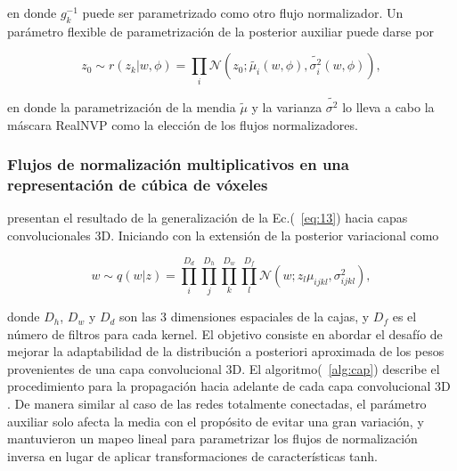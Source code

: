 \documentclass[10pt, oneside, a4paper]{article}
\begin{document}
	en donde $g_{k}^{-1}$ puede ser parametrizado como otro flujo normalizador. Un parámetro flexible de parametrización de la posterior auxiliar puede darse por
	
	\begin{equation} \label{eq:19}
	z_{0} \sim r(z_{k}|w, \phi) = \prod_{i} \mathcal{N} (z_{0}; \tilde{\mu_{i}}(w, \phi), \tilde{\sigma_{i}^{2}}(w, \phi)),
	\end{equation}	
	
	en donde la parametrización de la mendia $\tilde{\mu}$ y la varianza $\tilde{\sigma^{2}}$ lo lleva a cabo la máscara RealNVP como la elección de los flujos normalizadores.

	\subsubsection{Flujos de normalización multiplicativos en una representación de cúbica de vóxeles}
	
	\cite{mnf} presentan el resultado de la generalización de la Ec.(~\ref{eq:13}) hacia capas convolucionales 3D. Iniciando con la extensión de la posterior variacional como
	
	\begin{equation} \label{eq:20}
		w \sim q(w|z) = \prod_{i}^{D_{d}} \prod_{j}^{D_{h}} \prod_{k}^{D_{w}} \prod_{l}^{D_{f}} \mathcal{N}(w; z_{l} \mu_{ijkl}, \sigma_{ijkl}^{2}),
	\end{equation}

	donde $D_{h}$, $D_{w}$ y $D_{d}$ son las 3 dimensiones espaciales de la cajas, y $D_{f}$ es el número de filtros para cada kernel. El objetivo consiste en abordar el desafío de mejorar la adaptabilidad de la distribución a posteriori aproximada de los pesos provenientes de una capa convolucional 3D. El algoritmo(~\ref{alg:cap}) describe el procedimiento para la propagación hacia adelante de cada capa convolucional 3D \cite{mnf}.
	De manera similar al caso de las redes totalmente conectadas, el parámetro auxiliar solo afecta la media con el propósito de evitar una gran variación, y mantuvieron un mapeo lineal para parametrizar los flujos de normalización inversa en lugar de aplicar transformaciones de características tanh.
	
\end{document}
